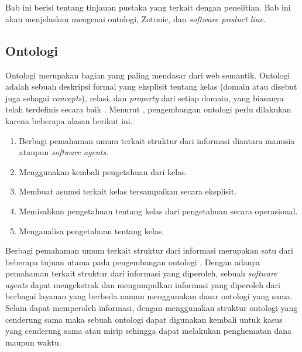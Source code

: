\chapter{\babDua}
Bab ini berisi tentang tinjauan pustaka yang terkait dengan penelitian. Bab ini akan menjelaskan mengenai ontologi, Zotonic, dan \textit{software product line}.
\section{Ontologi}
	
Ontologi merupakan bagian yang paling mendasar dari web semantik. Ontologi
adalah sebuah deskripsi formal yang eksplisit tentang kelas (domain atau disebut juga sebagai \textit{concepts}), relasi, dan \textit{property} dari setiap domain, yang biasanya telah terdefinis secara baik \citep{hopkins_powell_2015}. Menurut \cite{ontologydevelopment}, pengembangan ontologi perlu dilakukan karena beberapa alasan berikut ini.

\begin{enumerate}
\item Berbagi pemahaman umum terkait struktur dari informasi diantara manusia ataupun \textit{software agents}.
\item Menggunakan kembali pengetahuan dari kelas.
\item Membuat asumsi terkait kelas tersampaikan secara eksplisit.
\item Memisahkan pengetahuan tentang kelas dari pengetahuan secara operasional.
\item Menganalisa pengetahuan tentang kelas.
\end{enumerate}

Berbagi pemahaman umum terkait struktur dari informasi merupakan satu dari beberapa tujuan utama pada pengembangan ontologi \citep{paper.gruber}. Dengan adanya pemahaman terkait struktur dari informasi yang diperoleh, sebuah \textit{software agents} dapat mengekstrak dan mengumpulkan informasi yang diperoleh dari berbagai layanan yang berbeda namun menggunakan dasar ontologi yang sama. Selain dapat memperoleh informasi, dengan menggunakan struktur ontologi yang cenderung sama maka sebuah ontologi dapat digunakan kembali untuk kasus yang cenderung sama atau mirip sehingga dapat melakukan penghematan dana maupun waktu.

